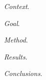 


\begin{abstracts}        %

\noindent \textit{Context}. 

\noindent \textit{Goal}. 

\noindent \textit{Method}. 

\noindent \textit{Results}. 

\noindent \textit{Conclusions}. 

\end{abstracts}


